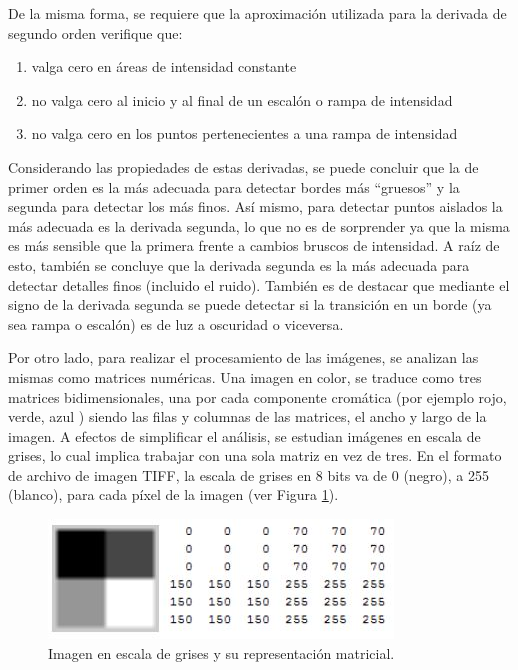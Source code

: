 De la misma forma, se requiere que la aproximación utilizada para la derivada de segundo orden verifique que:

\begin{enumerate}
\item valga cero en áreas de intensidad constante
\item no valga cero al inicio y al final de un escalón o rampa de intensidad
\item no valga cero en los puntos pertenecientes a una rampa de intensidad
\end{enumerate}

Considerando las propiedades de estas derivadas, se puede concluir que la de primer orden es la más adecuada para detectar bordes más ``gruesos'' y la segunda para detectar los más finos. Así mismo, para detectar puntos aislados la más adecuada es la derivada segunda, lo que no es de sorprender ya que la misma es más sensible que la primera frente a cambios bruscos de intensidad. A raíz de esto, también se concluye que la derivada segunda es la más adecuada para detectar detalles finos (incluido el ruido). También es de destacar que mediante el signo de la derivada segunda se puede detectar si la transición en un borde (ya sea rampa o escalón) es de luz a oscuridad o viceversa.

Por otro lado, para realizar el procesamiento de las imágenes, se analizan las mismas como matrices numéricas. Una imagen en color, se traduce como tres matrices bidimensionales, una por cada componente cromática (por ejemplo rojo, verde, azul ) siendo las filas y columnas de las matrices, el ancho y largo de la imagen. 
A efectos de simplificar el análisis, se estudian imágenes en escala de grises, lo cual implica trabajar con una sola matriz en vez de tres. En el formato de archivo de imagen TIFF, la escala de grises en 8 bits va de 0 (negro), a 255 (blanco), para cada píxel de la imagen (ver Figura \ref{gonz2}).

\begin{figure}[hbt]
\begin{center}
\includegraphics[scale=0.8]{img/02_escala_grises.jpg}
\end{center}
\caption{Imagen en escala de grises y su representación matricial.}
\label{gonz2}
\end{figure}

